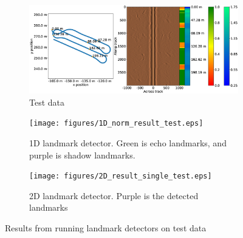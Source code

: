 \begin{figure} %
     \centering
    \begin{subfigure}[t]{1.0\textwidth}
         \centering
         \includegraphics[trim=0cm 3cm 0cm 4cm, clip=true, width=\textwidth]{figures/path_sonar_colorbars_test.eps}
         \caption{Test data}
         \label{fig:test_data}
     \end{subfigure}
     \hfill
     \begin{subfigure}[b]{0.48\textwidth}
         \centering
         \texttt{[image: figures/1D\_norm\_result\_test.eps]}
         \caption{1D landmark detector. Green is echo landmarks, and purple is shadow landmarks.}
         \label{fig:1D_norm_result_test}
     \end{subfigure}
     \hfill
     \begin{subfigure}[b]{0.48\textwidth}
         \centering
         \texttt{[image: figures/2D\_result\_single\_test.eps]}
         \caption{2D landmark detector. Purple is the detected landmarks}
         \label{fig:2D_result_single_test}
     \end{subfigure}
        \caption{Results from running landmark detectors on test data}
        \label{fig:landmark_detection_test_data}
\end{figure}
